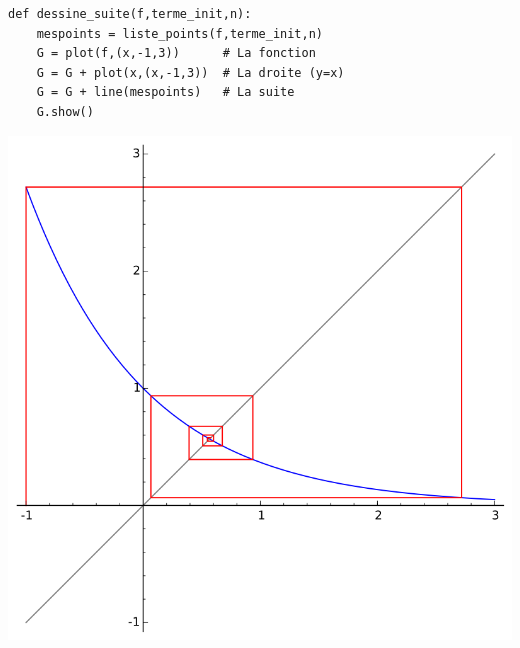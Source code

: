 \begin{frame}[fragile]

\begin{algo}
\begin{lstlisting}
def dessine_suite(f,terme_init,n):
    mespoints = liste_points(f,terme_init,n)
    G = plot(f,(x,-1,3))      # La fonction
    G = G + plot(x,(x,-1,3))  # La droite (y=x)
    G = G + line(mespoints)   # La suite
    G.show()
\end{lstlisting}
\end{algo}

\pause

\hfill\hfill{}

\vbox{\vspace*{-3ex}
\hspace*{2em}\includegraphics[scale=0.3]{figures/suites-visual1}
}


\end{frame}



